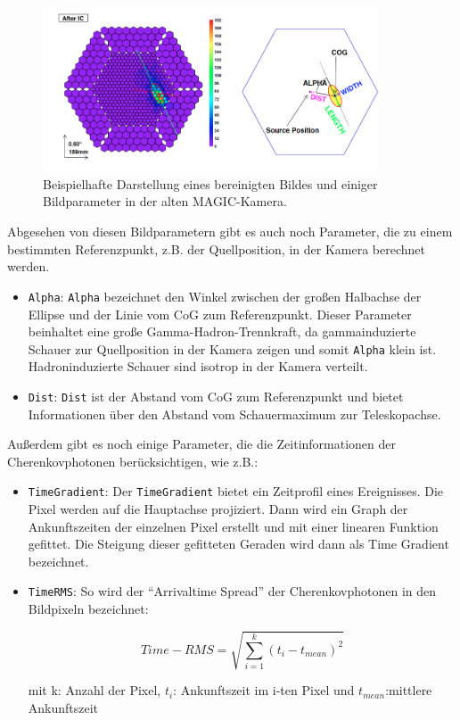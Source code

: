 \begin{figure}
    \centering
    \includegraphics[width=0.9\textwidth]{./Plots/03_MonteCarlos/CleaningBild.png}
    \caption{Beispielhafte Darstellung eines bereinigten Bildes und einiger Bildparameter in der alten MAGIC-Kamera.\cite{ImageCleaning}}
    \label{CleaningBild}
\end{figure}

Abgesehen von diesen Bildparametern gibt es auch noch Parameter, die zu einem bestimmten Referenzpunkt, z.B. der Quellposition, in der Kamera berechnet werden. 

\begin{itemize}
 \item \texttt{Alpha}: \texttt{Alpha} bezeichnet den Winkel zwischen der großen Halbachse der Ellipse und der Linie vom CoG zum Referenzpunkt.
 Dieser Parameter beinhaltet eine große Gamma-Hadron-Trennkraft, da gammainduzierte Schauer zur Quellposition in der Kamera zeigen und somit \texttt{Alpha} klein ist.
 Hadroninduzierte Schauer sind isotrop in der Kamera verteilt.
 \item \texttt{Dist}: \texttt{Dist} ist der Abstand vom CoG zum Referenzpunkt und bietet Informationen über den Abstand vom Schauermaximum zur Teleskopachse.
\end{itemize}

Außerdem gibt es noch einige Parameter, die die Zeitinformationen der Cherenkovphotonen berücksichtigen, wie z.B.:

\begin{itemize}
 \item \texttt{TimeGradient}: Der \texttt{TimeGradient} bietet ein Zeitprofil eines Ereignisses.
 Die Pixel werden auf die Hauptachse projiziert.
 Dann wird ein Graph der Ankunftszeiten der einzelnen Pixel erstellt und mit einer linearen Funktion gefittet.
 Die Steigung dieser gefitteten Geraden wird dann als Time Gradient bezeichnet.
 \item \texttt{TimeRMS}: So wird der ``Arrivaltime Spread'' der Cherenkovphotonen in den Bildpixeln bezeichnet:
 
\begin{equation}
 Time-RMS=\sqrt{\sum_{i=1}^k (t_i-t_{mean})^2}
\end{equation}
 \begin{center}
  \small{mit k: Anzahl der Pixel, $t_i$: Ankunftszeit im i-ten Pixel und $t_{mean}$:mittlere Ankunftszeit}
 \end{center}


\end{itemize}

